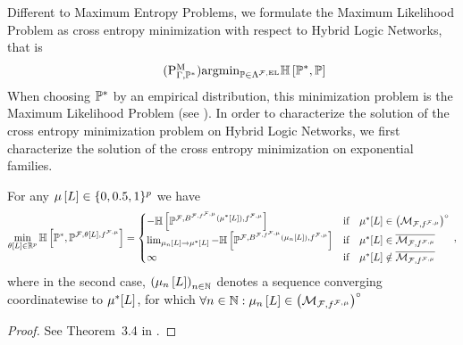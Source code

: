 
Different to Maximum Entropy Problems, we formulate the Maximum Likelihood Problem as cross entropy minimization with respect to Hybrid Logic Networks, that is
\begin{align}
    \tag{$\probtagtypeinst{\mathrm{M}}{\Gamma,\gendistribution}$}\label{prob:minCrossEntropyHLN}
    \argmin_{\probtensor\in\elrealizabledistsof{\mlnstat}} \centropyof{\gendistribution}{\probtensor}
\end{align}
When choosing $\mathbb{P}^*$ by an empirical distribution, this minimization problem is the Maximum Likelihood Problem (see ).
In order to characterize the solution of the cross entropy minimization problem on Hybrid Logic Networks, we first characterize the solution of the cross entropy minimization on exponential families.

\begin{lemma}
    For any $\mu\left[L\right]\in\{0,0.5,1\}^p$ we have
    \begin{align*}
        \min_{\theta\left[L\right]\in\mathbb{R}^{p}} \mathbb{H}\left[\mathbb{P}^*,\mathbb{P}^{\mathcal{F},\theta\left[L\right],f^{\mathcal{F},\mu}}\right]
        = \begin{cases}
              -\mathbb{H}\left[\mathbb{P}^{\mathcal{F},B^{\mathcal{F},f^{\mathcal{F},\mu}}(\mu^*[L]),f^{\mathcal{F},\mu}}\right] & \text{if} \quad \mu^*[L] \in {\left(\mathcal{M}_{\mathcal{F},f^{\mathcal{F},\mu}}\right)}^{\circ} \\
              \lim_{\mu_{n}\left[L\right]\rightarrow\mu^*[L]}-\mathbb{H}\left[\mathbb{P}^{\mathcal{F},B^{\mathcal{F},f^{\mathcal{F},\mu}}(\mu_{n}\left[L\right]),f^{\mathcal{F},\mu}}\right] & \text{if} \quad \mu^*[L] \in \overline{\mathcal{M}_{\mathcal{F},f^{\mathcal{F},\mu}}} \\
              \infty & \text{if} \quad \mu^*[L] \notin \overline{\mathcal{M}_{\mathcal{F},f^{\mathcal{F},\mu}}}
        \end{cases} \, ,
    \end{align*}
    where in the second case, $\left(\mu_{n}\left[L\right]\right)_{n\in\mathbb{N}}$ denotes a sequence converging coordinatewise to $\mu^*[L]$, for which $\forall{n\in\mathbb{N}}:{\mu_{n}\left[L\right]\in{\left(\mathcal{M}_{\mathcal{F},f^{\mathcal{F},\mu}}\right)}^{\circ}}$ \\
\end{lemma}
\begin{proof}
    See Theorem~3.4 in \cite{wainwright_graphical_2008}.
\end{proof}

